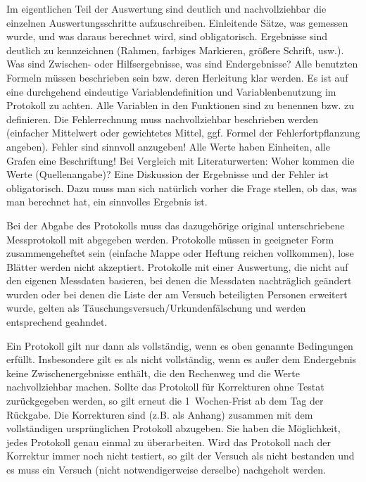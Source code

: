 Im eigentlichen Teil der Auswertung sind deutlich und nachvollziehbar die einzelnen Auswertungsschritte aufzuschreiben. Einleitende Sätze, was gemessen wurde, und was daraus berechnet wird, sind obligatorisch. Ergebnisse sind deutlich zu kennzeichnen (Rahmen, farbiges Markieren, größere Schrift, usw.). Was sind Zwischen- oder Hilfsergebnisse, was sind Endergebnisse? Alle benutzten Formeln müssen beschrieben sein bzw. deren Herleitung klar werden. Es ist auf eine durchgehend eindeutige Variablendefinition und Variablenbenutzung im Protokoll zu achten. Alle Variablen in den Funktionen sind zu benennen bzw. zu definieren. Die Fehlerrechnung muss nachvollziehbar beschrieben werden (einfacher Mittelwert oder gewichtetes Mittel, ggf. Formel der Fehlerfortpflanzung angeben). Fehler sind sinnvoll anzugeben! Alle Werte haben Einheiten, alle Grafen eine Beschriftung! Bei Vergleich mit Literaturwerten: Woher kommen die Werte (Quellenangabe)? Eine Diskussion der Ergebnisse und der Fehler ist obligatorisch. Dazu muss man sich natürlich vorher die Frage stellen, ob das, was man berechnet hat, ein sinnvolles Ergebnis ist.

Bei der Abgabe des Protokolls muss das dazugehörige original unterschriebene Messprotokoll mit abgegeben werden. Protokolle müssen in geeigneter Form zusammengeheftet sein (einfache Mappe oder Heftung reichen vollkommen), lose Blätter werden nicht akzeptiert.
Protokolle mit einer Auswertung, die nicht auf den eigenen Messdaten basieren, bei denen die Messdaten nachträglich geändert wurden oder bei denen die Liste der am Versuch beteiligten Personen erweitert wurde, gelten als Täuschungsversuch/Urkundenfälschung und werden entsprechend geahndet.
%
%


Ein Protokoll gilt nur dann als vollständig, wenn es oben genannte Bedingungen erfüllt. Insbesondere gilt es als nicht vollständig, wenn es außer dem Endergebnis keine Zwischenergebnisse enthält, die den Rechenweg und die Werte nachvollziehbar machen. Sollte das Protokoll für Korrekturen ohne Testat zurückgegeben werden, so gilt erneut die 1~Wochen-Frist ab dem Tag der Rückgabe. Die Korrekturen sind (z.B. als Anhang) zusammen mit dem vollständigen ursprünglichen Protokoll abzugeben. Sie haben die Möglichkeit, jedes Protokoll genau einmal zu überarbeiten. Wird das Protokoll nach der Korrektur immer noch nicht testiert, so gilt der Versuch als nicht bestanden und es muss ein Versuch (nicht notwendigerweise derselbe) nachgeholt werden.

